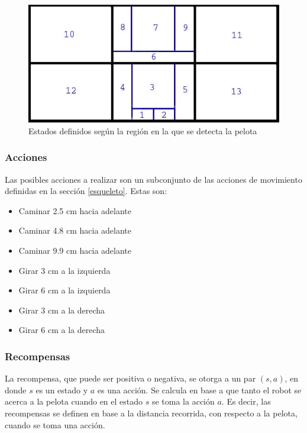 \begin{figure}[hbtp]
\centering
\includegraphics[scale=0.5]{imagenes/Regiones.jpg}
\caption{Estados definidos seg\'un la región en la que se detecta la pelota}
\label{fig:estados}
\end{figure}


\subsubsection{Acciones}

Las posibles acciones a realizar son un subconjunto de las acciones de movimiento definidas en la sección \ref{esqueleto}. Estas son:

\begin{itemize}
\item {Caminar 2.5 cm hacia adelante }
\item {Caminar 4.8 cm hacia adelante }
\item {Caminar 9.9 cm hacia adelante }
\item {Girar 3 cm a la izquierda}
\item {Girar 6 cm a la izquierda} 
\item {Girar 3 cm a la derecha}
\item {Girar 6 cm a la derecha}
\end{itemize}

\subsubsection{Recompensas}

La recompensa, que puede ser positiva o negativa, se otorga a un par $(s,a)$, en donde $s$ es un estado y $a$ es una acci\'on. Se calcula en base a que tanto el robot se acerca a la pelota cuando en el estado $s$ se toma la acci\'on $a$. Es decir, las recompensas se definen en base a la distancia recorrida, con respecto a la pelota, cuando se toma una acci\'on.  

